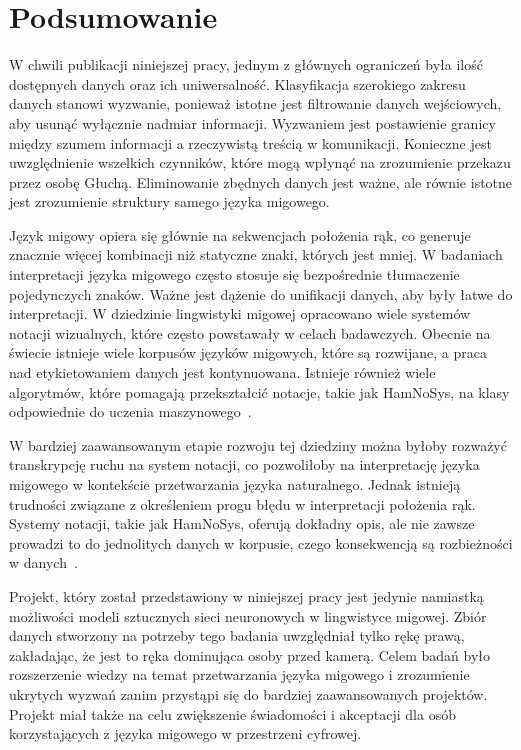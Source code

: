 \hypersetup{pageanchor=true}

\chapter{Podsumowanie}\label{ch:summary}

W chwili publikacji niniejszej pracy, jednym z głównych ograniczeń była ilość dostępnych danych oraz ich uniwersalność. Klasyfikacja szerokiego zakresu danych stanowi wyzwanie, ponieważ istotne jest filtrowanie danych wejściowych, aby usunąć wyłącznie nadmiar informacji. Wyzwaniem jest postawienie granicy między szumem informacji a rzeczywistą treścią w komunikacji. Konieczne jest uwzględnienie wszelkich czynników, które mogą wpłynąć na zrozumienie przekazu przez osobę Głuchą. Eliminowanie zbędnych danych jest ważne, ale równie istotne jest zrozumienie struktury samego języka migowego.

Język migowy opiera się głównie na sekwencjach położenia rąk, co generuje znacznie więcej kombinacji niż statyczne znaki, których jest mniej. W badaniach interpretacji języka migowego często stosuje się bezpośrednie tłumaczenie pojedynczych znaków. Ważne jest dążenie do unifikacji danych, aby były łatwe do interpretacji. W dziedzinie lingwistyki migowej opracowano wiele systemów notacji wizualnych, które często powstawały w celach badawczych. Obecnie na świecie istnieje wiele korpusów języków migowych, które są rozwijane, a praca nad etykietowaniem danych jest kontynuowana. Istnieje również wiele algorytmów, które pomagają przekształcić notacje, takie jak HamNoSys, na klasy odpowiednie do uczenia maszynowego~\cite{majchrowska2022}.

W bardziej zaawansowanym etapie rozwoju tej dziedziny można byłoby rozważyć transkrypcję ruchu na system notacji, co pozwoliłoby na interpretację języka migowego w kontekście przetwarzania języka naturalnego. Jednak istnieją trudności związane z określeniem progu błędu w interpretacji położenia rąk. Systemy notacji, takie jak HamNoSys, oferują dokładny opis, ale nie zawsze prowadzi to do jednolitych danych w korpusie, czego konsekwencją są rozbieżności w danych~\cite{ferlin2023}.

Projekt, który został przedstawiony w niniejszej pracy jest jedynie namiastką możliwości modeli sztucznych sieci neuronowych w lingwistyce migowej. Zbiór danych stworzony na potrzeby tego badania uwzględniał tylko rękę prawą, zakładając, że jest to ręka dominująca osoby przed kamerą. Celem badań było rozszerzenie wiedzy na temat przetwarzania języka migowego i zrozumienie ukrytych wyzwań zanim przystąpi się do bardziej zaawansowanych projektów. Projekt miał także na celu zwiększenie świadomości i akceptacji dla osób korzystających z języka migowego w przestrzeni cyfrowej.

